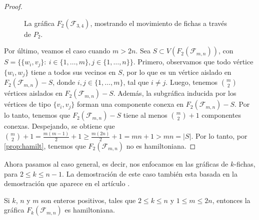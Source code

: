 \begin{proof}
\begin{figure}[ht!]
    
        \caption{La gr\'afica $F_2(\mathcal{F}_{3,4})$, mostrando el movimiento
        de fichas a trav\'es de $P_2$.}
    \label{fig:exe-tray-n-m}     
    \end{figure}

Por \'ultimo, veamos el caso cuando $m>2n$. Sea $S \subset
V(F_2(\mathcal{F}_{m,n}))$, con $S=\{\{w_i,v_j\} \colon\ i \in
\{1,\dots,m\},j\in\{1,\dots,n\}\}$. Primero, observamos que todo v\'ertice
$\{w_i,w_j\}$ tiene a todos sus vecinos en $S$, por lo que es un v\'ertice
aislado en $F_2(\mathcal{F}_{m,n})-S$, donde $i,j \in \{1,\dots,m\}$, tal que $i
\neq j$. Luego, tenemos $\binom{m}{2}$ v\'ertices aislados en
$F_2(\mathcal{F}_{m,n})-S$. Adem\'as, la subgr\'afica inducida por los
v\'ertices de tipo $\{v_i,v_j\}$ forman una componente conexa en
$F_2(\mathcal{F}_{m,n})-S$. Por lo tanto, tenemos que $F_2(\mathcal{F}_{m,n})-S$
tiene al menos $\binom{m}{2} + 1$ componentes conexas. Despejando, se obtiene
que $\binom{m}{2} + 1 = \frac{m(m-1)}{2} + 1 \geq \frac{m(2n)}{2} + 1 = mn + 1 >
mn = |S|$. Por lo tanto, por \cref{prop:hamilt}, tenemos que
$F_2(\mathcal{F}_{m,n})$ no es hamiltoniana.

\end{proof}

Ahora pasamos al caso general, es decir, nos enfocamos en las gr\'aficas de
$k$-fichas, para $2 \leq k \leq n-1$. La demostraci\'on de este caso tambi\'en
esta basada en la demostraci\'on que aparece en el art\'iculo
\cite{adameHamilt}.

\begin{teorema}
\label{teo:TokGenerFan}
    Si $k$, $n$ y $m$ son enteros positivos, tales que $2 \leq k \leq n$ y $1
       \leq m \leq 2n$, entonces la gr\'afica $F_k(\mathcal{F}_{m,n})$ es
       hamiltoniana.
\end{teorema}

